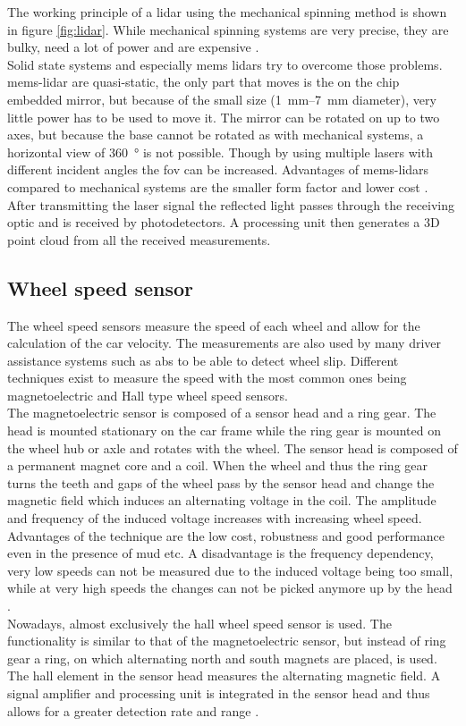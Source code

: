 The working principle of a \gls{lidar} using the mechanical spinning method is shown in figure \ref{fig:lidar}.
While mechanical spinning systems are very precise, they are bulky, need a lot of power and are expensive \cite{Fujii2005}.\\
Solid state systems and especially \gls{mems} \gls{lidar}s try to overcome those problems.
\gls{mems}-\gls{lidar} are quasi-static, the only part that moves is the on the chip embedded mirror, but because of the small size (\SIrange{1}{7}{\milli\metre} diameter), very little power has to be used to move it.
The mirror can be rotated on up to two axes, but because the base cannot be rotated as with mechanical systems, a horizontal view of \SI{360}{\degree} is not possible.
Though by using multiple lasers with different incident angles the \gls{fov} can be increased.
Advantages of \gls{mems}-\gls{lidar}s compared to mechanical systems are the smaller form factor and lower cost \cite{Wang2020}.\\
After transmitting the laser signal the reflected light passes through the receiving optic and is received by photodetectors.
A processing unit then generates a 3D point cloud from all the received measurements.


\subsection{Wheel speed sensor}
The wheel speed sensors measure the speed of each wheel and allow for the calculation of the car velocity.
The measurements are also used by many driver assistance systems such as \gls{abs} to be able to detect wheel slip.
Different techniques exist to measure the speed with the most common ones being magnetoelectric and Hall type wheel speed sensors.\\
The magnetoelectric sensor is composed of a sensor head and a ring gear.
The head is mounted stationary on the car frame while the ring gear is mounted on the wheel hub or axle and rotates with the wheel.
The sensor head is composed of a permanent magnet core and a coil.
When the wheel and thus the ring gear turns the teeth and gaps of the wheel pass by the sensor head and change the magnetic field which induces an alternating voltage in the coil.
The amplitude and frequency of the induced voltage increases with increasing wheel speed.
Advantages of the technique are the low cost, robustness and good performance even in the presence of mud etc.
A disadvantage is the frequency dependency, very low speeds can not be measured due to the induced voltage being too small, while at very high speeds the changes can not be picked anymore up by the head \cite{AutoReif2014}.\\
Nowadays, almost exclusively the hall wheel speed sensor is used.
The functionality is similar to that of the magnetoelectric sensor, but instead of ring gear a ring, on which alternating north and south magnets are placed, is used.
The hall element in the sensor head measures the alternating magnetic field.
A signal amplifier and processing unit is integrated in the sensor head and thus allows for a greater detection rate and range \cite{Re2011}.


